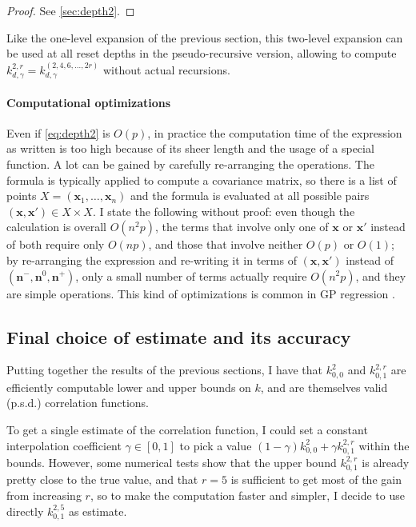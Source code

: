 \documentclass[a4paper]{article}
\newcommand{\nvecs}{\mathbf n^-, \mathbf n^0, \mathbf n^+}
\theoremstyle{definition}
\begin{document}
    \begin{proof}
        See \autoref{sec:depth2}.
    \end{proof}

    Like the one-level expansion of the previous section, this two-level expansion can be used at all reset depths in the pseudo-recursive version, allowing to compute $k^{2,r}_{d,\gamma} = k^{(2,4,6,\ldots,2r)}_{d,\gamma}$ without actual recursions.

    \paragraph{Computational optimizations}

    Even if \autoref{eq:depth2} is $O(p)$, in practice the computation time of the expression as written is too high because of its sheer length and the usage of a special function. A lot can be gained by carefully re-arranging the operations. The formula is typically applied to compute a covariance matrix, so there is a list of points $X = (\mathbf x_1, \ldots, \mathbf x_n)$ and the formula is evaluated at all possible pairs $(\mathbf x, \mathbf x') \in X \times X$. I state the following without proof: even though the calculation is overall $O(n^2p)$, the terms that involve only one of $\mathbf x$ or $\mathbf x'$ instead of both require only $O(np)$, and those that involve neither $O(p)$ or $O(1)$; by re-arranging the expression and re-writing it in terms of $(\mathbf x, \mathbf x')$ instead of $(\nvecs)$, only a small number of terms actually require $O(n^2p)$, and they are simple operations. This kind of optimizations is common in GP regression \autocite[see, e.g.,][\S A.2]{epperly2024}.
    
    \subsection{Final choice of estimate and its accuracy}
    \label{sec:finalkernel}

    Putting together the results of the previous sections, I have that $k^2_{0,0}$ and $k^{2,r}_{0,1}$ are efficiently computable lower and upper bounds on $k$, and are themselves valid (p.s.d.) correlation functions.

    To get a single estimate of the correlation function, I could set a constant interpolation coefficient $\gamma\in[0,1]$ to pick a value $(1-\gamma)k^2_{0,0} + \gamma k^{2,r}_{0,1}$ within the bounds. However, some numerical tests show that the upper bound $k^{2,r}_{0,1}$ is already pretty close to the true value, and that $r=5$ is sufficient to get most of the gain from increasing $r$, so to make the computation faster and simpler, I decide to use directly $k^{2,5}_{0,1}$ as estimate.
\end{document}
